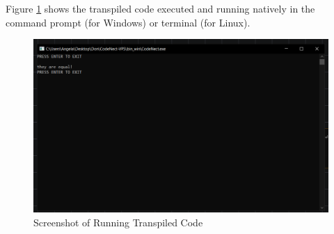 \parx
Figure \ref{fig:cn_run} shows the transpiled code executed and running natively in the
command prompt (for Windows) or terminal (for Linux).

\begin{figure}[H]
	\centering
	\captionsetup{justification=centering}
	\captionsetup[figure]{list=yes}
	\includegraphics[width=\linewidth]{media/sc_run.png}
	\caption[Screenshot of Running Transpiled Code]{Screenshot of Running Transpiled Code}
	\label{fig:cn_run}
\end{figure}
